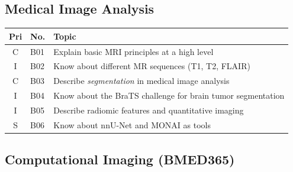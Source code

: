 \documentclass[11pt,a4paper]{article}
\begin{document}
\subsection{Medical Image Analysis}

\begin{longtable}{@{}clp{9cm}@{}}
\toprule
\textbf{Pri} & \textbf{No.} & \textbf{Topic} \\
\midrule
\endfirsthead
\midrule
\endhead
\midrule
\endfoot
\bottomrule
\endlastfoot
C & B01 & Explain basic MRI principles at a high level \\
I & B02 & Know about different MR sequences (T1, T2, FLAIR) \\
C & B03 & Describe \emph{segmentation} in medical image analysis \\
I & B04 & Know about the BraTS challenge for brain tumor segmentation \\
I & B05 & Describe radiomic features and quantitative imaging \\
S & B06 & Know about nnU-Net and MONAI as tools \\
\end{longtable}

\subsection{Computational Imaging (BMED365)}
\end{document}
